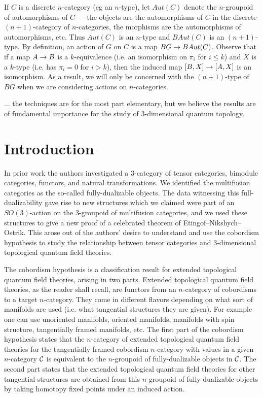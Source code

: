 \documentclass{amsart}
\begin{document}
If $C$ is a discrete $n$-category (eg an $n$-type), let $Aut(C)$ denote the $n$-groupoid of automorphisms of $C$ --- the objects are the automorphisms of $C$ in the discrete $(n+1)$-category of $n$-categories, the morphisms are the automorphisms of automorphisms, etc.  Thus $Aut(C)$ is an $n$-type and $BAut(C)$ is an $(n+1)$-type.  By definition, an action of $G$ on $C$ is a map $BG \rightarrow BAut(C)$.  Observe that if a map $A \rightarrow B$ is a $k$-equivalence (i.e. an isomorphism on $\pi_i$ for $i \leq k$) and $X$ is a $k$-type (i.e. has $\pi_i = 0$ for $i > k$), then the induced map $[B,X] \rightarrow [A,X]$ is an isomorphism.  As a result, we will only be concerned with the $(n+1)$-type of $BG$ when we are considering actions on $n$-categories.

... the techniques are for the most part elementary, but we believe the results are of fundamental importance for the study of 3-dimensional quantum topology.


\section{Introduction}

In prior work the authors investigated a 3-category of tensor categories, bimodule categories, functors, and natural transformations. We identified the multifusion categories as the so-called fully-dualizable objects. The data witnessing this full-dualizability gave rise to new structures which we claimed were part of an $SO(3)$-action on the 3-groupoid of multifusion categories, and we used these structures to give a new proof of a celebrated theorem of Etingof--Nikshych--Ostrik. This arose out of the authors' desire to understand and use the cobordism hypothesis to study the relationship between tensor categories and 3-dimensional topological quantum field theories. 

The cobordism hypothesis is a classification result for extended topological quantum field theories, arising in two parts. Extended topological quantum field theories, as the reader shall recall, are functors from an $n$-category of cobordisms to a target $n$-category. They come in different flavors depending on what sort of manifolds are used (i.e. what tangential structures they are given). For example one can use unoriented manifolds, oriented manifolds, manifolds with spin structure, tangentially framed manifolds, etc. The first part of the cobordism hypothesis states that the $n$-category of extended topological quantum field theories for the tangentially framed cobordism $n$-category with values in a given $n$-category $\mathcal C$ is equivalent to the $n$-groupoid of fully-dualizable objects in $\mathcal C$. The second part states that the  extended topological quantum field theories for other tangential structures are obtained from this $n$-groupoid of fully-dualizable objects by taking homotopy fixed points under an induced action. 
\end{document}
